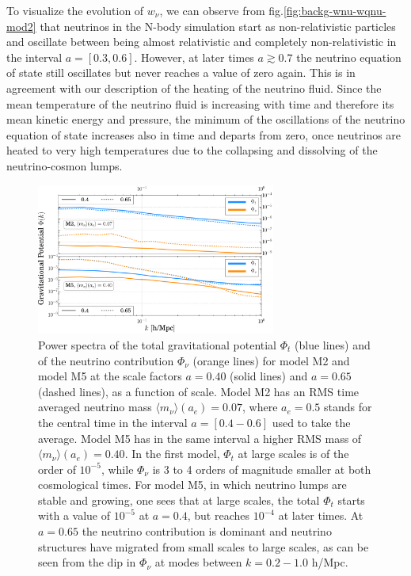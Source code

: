 To visualize the evolution of $w_{\nu}$, we can observe from fig.\ref{fig:backg-wnu-wqnu-mod2}
that neutrinos in the N-body simulation start as non-relativistic
particles and oscillate between being almost relativistic and completely
non-relativistic in the interval $a=[0.3,0.6]$. However, at later
times $a\gtrsim0.7$ the neutrino equation of state still oscillates
but never reaches a value of zero again. This is in agreement with
our description of the heating of the neutrino fluid. Since the mean
temperature of the neutrino fluid is increasing with time and therefore
its mean kinetic energy and pressure, the minimum of the oscillations
of the neutrino equation of state increases also in time and departs
from zero, once neutrinos are heated to very high temperatures due
to the collapsing and dissolving of the neutrino-cosmon lumps.

\begin{figure}
\centering{}\includegraphics[width=0.7\textwidth]{Chapters/gnq/figures/Phi-GravPotSpec-M2-and-M5-at-006500-Phit_Phinu-new}
\caption[Gravitational potential $\Phi$ for models of GNQ.]{\label{fig:gravpot-in-scale} Power spectra of the total gravitational
potential $\Phi_{t}$ (blue lines) and of the neutrino contribution
$\Phi_{\nu}$ (orange lines) for model M2 and model M5 at the scale
factors $a=0.40$ (solid lines) and $a=0.65$ (dashed lines), as a
function of scale. Model M2 has an RMS time averaged neutrino mass
$\langle m_{\nu}\rangle(a_{e})=0.07$, where $a_{e}=0.5$ stands for
the central time in the interval $a=[0.4-0.6]$ used to take the average.
Model M5 has in the same interval a higher RMS mass of $\langle m_{\nu}\rangle(a_{e})=0.40$.
In the first model, $\Phi_{t}$ at large scales is of the order of
$10^{-5}$, while $\Phi_{\nu}$ is 3 to 4 orders of magnitude smaller
at both cosmological times. For model M5, in which neutrino lumps
are stable and growing, one sees that at large scales, the total $\Phi_{t}$
starts with a value of $10^{-5}$ at $a=0.4$, but reaches $10^{-4}$
at later times. At $a=0.65$ the neutrino contribution is dominant
and neutrino structures have migrated from small scales to large scales,
as can be seen from the dip in $\Phi_{\nu}$ at modes between $k=0.2-1.0$
h/Mpc.}
\end{figure}



